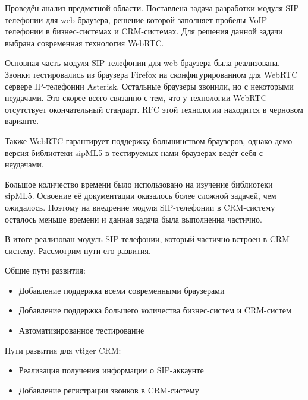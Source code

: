 \conclusion
Проведён анализ предметной области. Поставлена задача разработки модуля SIP-телефонии для web-браузера, решение которой заполняет пробелы VoIP-телефонии в бизнес-системах и CRM-системах. Для решения данной задачи выбрана современная технология WebRTC.

Основная часть модуля SIP-телефонии для web-браузера была реализована. Звонки тестировались из браузера Firefox на сконфигурированном для WebRTC сервере IP-телефонии Asterisk. Остальные браузеры звонили, но с некоторыми неудачами. Это скорее всего связанно с тем, что у технологии WebRTC отсутствует окончательный стандарт. RFC этой технологии находится в черновом варианте.

Также WebRTC гарантирует поддержку большинством браузеров, однако демо-версия библиотеки sipML5 в тестируемых нами браузерах ведёт себя с неудачами.

Большое количество времени было использовано на изучение библиотеки sipML5. Освоение её документации оказалось более сложной задачей, чем ожидалось. Поэтому на внедрение модуля SIP-телефонии в CRM-систему осталось меньше времени и данная задача была выполненна частично.

В итоге реализован модуль SIP-телефонии, который частично встроен в CRM-систему. Рассмотрим пути его развития.

Общие пути развития:
\begin{itemize}
\item Добавление поддержка всеми современными браузерами
\item Добавление поддержка большего количества бизнес-систем и CRM-систем
\item Автоматизированное тестирование
\end{itemize}

Пути развития для vtiger CRM:
\begin{itemize}
\item Реализация получения информации о SIP-аккаунте
\item Добавление регистрации звонков в CRM-систему
\end{itemize}
